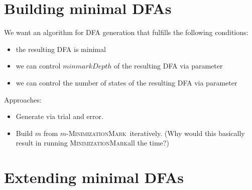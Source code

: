 \documentclass[a4paper, oneside, 11pt]{report}
\theoremstyle{definition}
\theoremstyle{remark}
\newcommand{\MinMark}{\textsc{MinimizationMark}}
\begin{document}
\chapter{Building minimal DFAs}

We want an algorithm for DFA generation that fulfills the following conditions:
\begin{itemize}
	\item the resulting DFA is minimal
	\item we can control $minmarkDepth$ of the resulting DFA via parameter
	\item we can control the number of states of the resulting DFA via parameter
\end{itemize}
Approaches:
\begin{itemize}
	\item Generate via trial and error.
	\item Build $m$ from $m$-\MinMark\ iteratively. (Why would this basically result in running \MinMark all the time?)
\end{itemize}



\chapter{Extending minimal DFAs}
\end{document}
